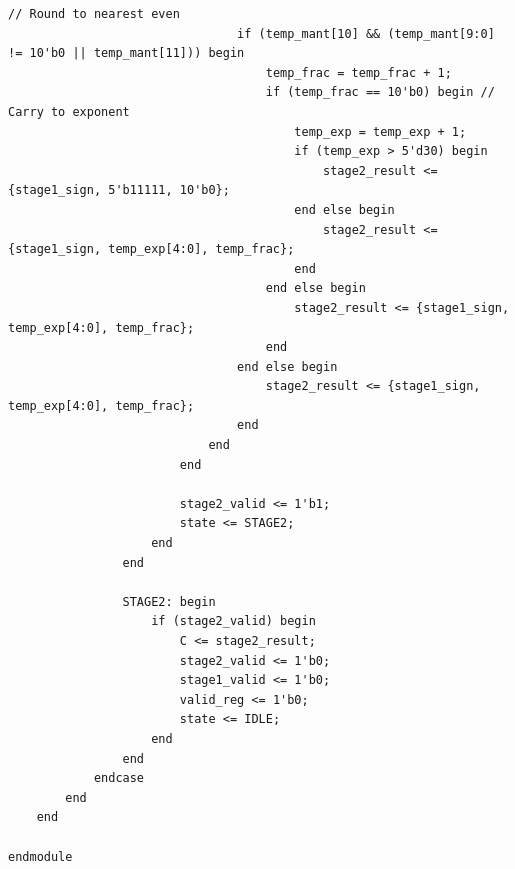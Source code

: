 \documentclass[UTF8]{ctexart}
\begin{document}
\begin{lstlisting}[frame=shadowbox,caption=fp\_multiplier\_generated3.sv]
                                // Round to nearest even
                                if (temp_mant[10] && (temp_mant[9:0] != 10'b0 || temp_mant[11])) begin
                                    temp_frac = temp_frac + 1;
                                    if (temp_frac == 10'b0) begin // Carry to exponent
                                        temp_exp = temp_exp + 1;
                                        if (temp_exp > 5'd30) begin
                                            stage2_result <= {stage1_sign, 5'b11111, 10'b0};
                                        end else begin
                                            stage2_result <= {stage1_sign, temp_exp[4:0], temp_frac};
                                        end
                                    end else begin
                                        stage2_result <= {stage1_sign, temp_exp[4:0], temp_frac};
                                    end
                                end else begin
                                    stage2_result <= {stage1_sign, temp_exp[4:0], temp_frac};
                                end
                            end
                        end
                        
                        stage2_valid <= 1'b1;
                        state <= STAGE2;
                    end
                end
                
                STAGE2: begin
                    if (stage2_valid) begin
                        C <= stage2_result;
                        stage2_valid <= 1'b0;
                        stage1_valid <= 1'b0;
                        valid_reg <= 1'b0;
                        state <= IDLE;
                    end
                end
            endcase
        end
    end

endmodule
\end{lstlisting}
\end{document}
